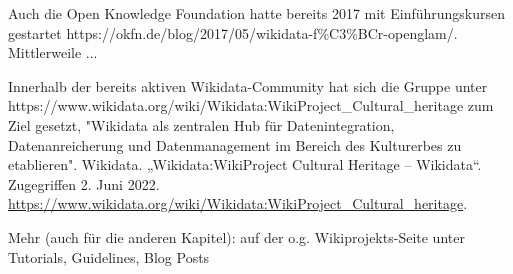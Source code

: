 \documentclass{article}
\begin{document}
Auch die Open Knowledge Foundation hatte bereits 2017 mit Einführungskursen gestartet https://okfn.de/blog/2017/05/wikidata-f\%C3\%BCr-openglam/. Mittlerweile ...


Innerhalb der bereits aktiven Wikidata-Community hat sich die Gruppe unter https://www.wikidata.org/wiki/Wikidata:WikiProject\_Cultural\_heritage zum Ziel gesetzt, "Wikidata als zentralen Hub für Datenintegration, Datenanreicherung und Datenmanagement im Bereich des Kulturerbes zu etablieren". Wikidata. „Wikidata:WikiProject Cultural Heritage – Wikidata“. Zugegriffen 2. Juni 2022. \href{https://www.wikidata.org/wiki/Wikidata:WikiProject_Cultural_heritage}{https://www.wikidata.org/wiki/Wikidata:WikiProject\_Cultural\_heritage}.


Mehr (auch für die anderen Kapitel): auf der o.g. Wikiprojekts-Seite unter Tutorials, Guidelines, Blog Posts 


\printbibliography[title={Literaturverzeichnis}]
\end{document}
